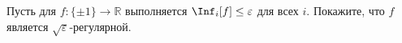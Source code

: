 Пусть для $f\colon \{\pm 1\} \to \mathbb{R}$ выполняется $\Inf_i[f] \le \varepsilon$ для всех
$i$. Покажите, что $f$ является $\sqrt{\varepsilon}$-регулярной.